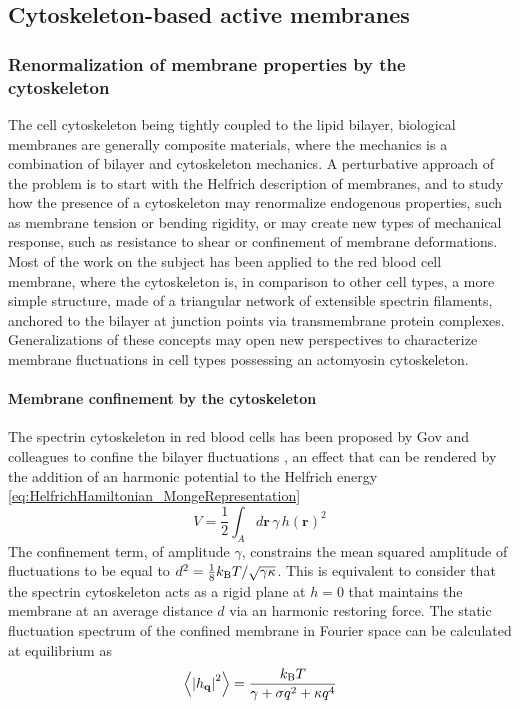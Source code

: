 \documentclass[graybox]{svmult}
\begin{document}
	\subsection{Cytoskeleton-based active membranes}
		\subsubsection{Renormalization of membrane properties by the cytoskeleton}
			The cell cytoskeleton being tightly coupled to the lipid bilayer, biological membranes are generally composite materials, where the mechanics is a combination of bilayer and cytoskeleton mechanics. A perturbative approach of the problem is to start with the Helfrich description of membranes, and to study how the presence of a cytoskeleton may renormalize endogenous properties, such as membrane tension or bending rigidity, or may create new types of mechanical response, such as resistance to shear or confinement of membrane deformations. Most of the work on the subject has been applied to the red blood cell membrane, where the cytoskeleton is, in comparison to other cell types, a more simple structure, made of a triangular network of extensible spectrin filaments, anchored to the bilayer at junction points via transmembrane protein complexes. Generalizations of these concepts may open new perspectives to characterize membrane fluctuations in cell types possessing an actomyosin cytoskeleton.
		
		\paragraph{\textbf{Membrane confinement by the cytoskeleton}}
			The spectrin cytoskeleton in red blood cells has been proposed by Gov and colleagues to confine the bilayer fluctuations \cite{Gov:2003}, an effect that can be rendered by the addition of an harmonic potential to the Helfrich energy \eqref{eq:HelfrichHamiltonian_MongeRepresentation}
\begin{equation}
			V = \frac{1}{2}\int_A d\mathbf{r}\,\gamma\, h(\mathbf{r})^2
\end{equation}
The confinement term, of amplitude $\gamma$, constrains the mean squared amplitude of fluctuations to be equal to $d^2 = \frac{1}{8}k_{\rm{B}}T/\sqrt{\gamma\kappa}$. This is equivalent to consider that the spectrin cytoskeleton acts as a rigid plane at $h=0$ that maintains the membrane at an average distance $d$ via an harmonic restoring force. The static fluctuation spectrum of the confined membrane in Fourier space can be calculated at equilibrium as
\begin{equation}
\left\langle \left| h_{\mathbf{q}}\right|^2 \right\rangle = \frac{k_{\rm{B}}T}{\gamma + \sigma q^2 + \kappa q^4}
\end{equation}
\end{document}
